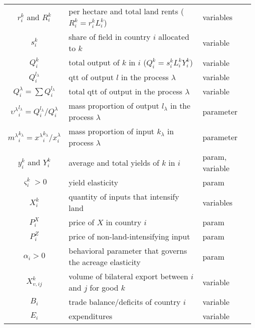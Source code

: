 \begin{tabular}{c|l|l}
    $r_i^k$ and $R_i^k$ & per hectare and total land rents ($R_i^k = r_i^k L_i^k$) & variables \\

    $s_i^k$ & share of field in country $i$ allocated to $k$ & variable \\

    $Q_i^k$ & total output of $k$ in $i$ ($Q_i^k = s_i^k L_i^k Y_i^k$) & variable \\

    ${Q_i^{l_\lambda}}$ & qtt of output $l$ in the process $\lambda$ & variable \\

    ${Q_i^\lambda = \sum Q_i^{l_\lambda}}$ & total qtt of output in the process $\lambda$ & variable \\

    ${{\upsilon^\lambda}_i^{l_\lambda} = Q_i^{l_\lambda}/Q_i^\lambda}$ & mass proportion of output $l_\lambda$ in the process $\lambda$ & parameter \\

    ${{m^\lambda}_i^{k_\lambda} = {x^\lambda}_i^{k_\lambda}/ x_i^\lambda}$ & mass proportion of input $k_\lambda$ in process $\lambda$ & parameter \\

    $y_i^k$ and $Y_i^k$ & average and total yields of $k$ in $i$ & param, variable \\

    $\varsigma_i^k > 0$ & yield elasticity & param \\

    $X_i^k$ & quantity of inputs that intensify land & variables \\

    $P_i^X$ & price of $X$ in country $i$ & param \\

    $P_i^Z$ & price of non-land-intensifying input & param \\

    $\alpha_i > 0$ & behavioral parameter that governs the acreage elasticity & param \\

    $X_{v,ij}^k$ & volume of bilateral export between $i$ and $j$ for good $k$ & variable \\

    $B_i$ & trade balance/deficits of country $i$ & variable \\

    $E_i$ & expenditures & variable \\

\end{tabular}